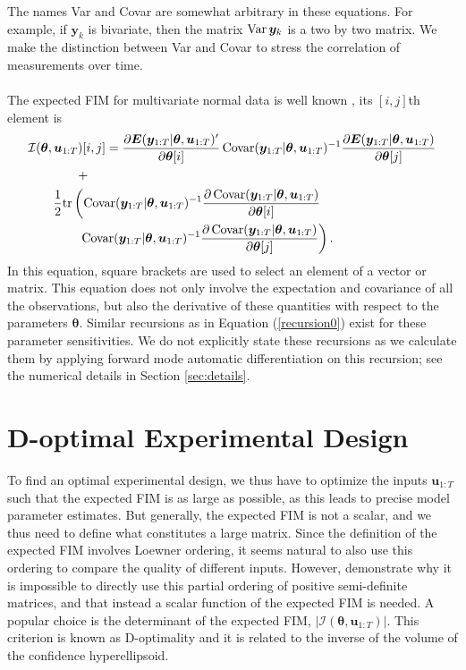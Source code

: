 The names Var and Covar are somewhat arbitrary in these equations. For example, if $\bm y_k$ is bivariate, then the matrix $\operatorname{\mathrm{Var}} \bm y_k$ is a two by two matrix. We make the distinction between Var and Covar to stress the correlation of measurements over time.
\\
\\
The expected FIM for multivariate normal data is well known \parencite{fedorov}, its $[i,j]$th element is
\begin{equation}
\label{FIMnormal}
\begin{aligned}
&\mathcal{I}(\bm \theta,\bm u_{1:T})[i,j]= 
\frac{\partial \bm E (\bm y_{1:T}| \bm \theta,\bm u_{1:T})'}{\partial \bm \theta[i]}
\operatorname{\mathrm{Covar}}(\bm y_{1:T}| \bm \theta,\bm u_{1:T})^{-1}\frac{\partial \bm E (\bm y_{1:T}| \bm \theta,\bm u_{1:T})}{\partial \bm \theta[j]} \\  &\qquad \qquad + \\
&\qquad \frac{1}{2}
\text{tr} \left (
\operatorname{\mathrm{Covar}}(\bm y_{1:T}| \bm \theta,\bm u_{1:T})^{-1}
\frac{\partial \operatorname{\mathrm{Covar}}(\bm y_{1:T}| \bm \theta,\bm u_{1:T})}{\partial \bm \theta[i]} \right.\\
&\qquad \left . \qquad
\operatorname{\mathrm{Covar}}(\bm y_{1:T}| \bm \theta,\bm u_{1:T})^{-1} 
\frac{\partial \operatorname{\mathrm{Covar}}(\bm y_{1:T}| \bm \theta,\bm u_{1:T})}{\partial \bm \theta[j]}
\right ).
\end{aligned}
\end{equation}
In this equation, square brackets are used to select an element of a vector or matrix. This equation does not only involve the expectation and covariance of all the observations, but also the derivative of these quantities with respect to the parameters $\bm \theta$. Similar recursions as in Equation (\ref{recursion0}) exist for these parameter sensitivities. We do not explicitly state these recursions as we calculate them by applying forward mode automatic differentiation on this recursion; see the numerical details in Section \ref{sec:details}. 
\section{D-optimal Experimental Design}
To find an optimal experimental design, we thus have to optimize the inputs $\bm u_{1:T}$ such that the expected FIM is as large as possible, as this leads to precise model parameter estimates. But generally, the expected FIM is not a scalar, and we thus need to define what constitutes a large matrix. Since the definition of the expected FIM involves Loewner ordering, it seems natural to also use this ordering to compare the quality of different inputs. However, \textcite{fedorov} demonstrate why it is impossible to directly use this partial ordering of positive semi-definite matrices, and that instead a scalar function of the expected FIM is needed. A popular choice is the determinant of the expected FIM, $\left| \mathcal{I}(\bm \theta,\bm u_{1:T})\right|$. This criterion is known as D-optimality and it is related to the inverse of the volume of the confidence hyperellipsoid.
